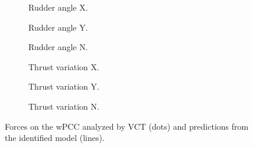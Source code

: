\begin{figure}[h]
    \vfill
     \begin{subfigure}[b]{0.32\textwidth}
         \centering
         
        \caption{Rudder angle X.}
        \label{fig:rudder_angle_X_wPCC}
     \end{subfigure}
     \hfill
     \begin{subfigure}[b]{0.32\textwidth}
         \centering
         
        \caption{Rudder angle Y.}
        \label{fig:rudder_angle_Y_wPCC}
     \end{subfigure}
     \hfill
     \begin{subfigure}[b]{0.32\textwidth}
         \centering
         
        \caption{Rudder angle N.}
        \label{fig:rudder_angle_N_wPCC}
     \end{subfigure}

     \vfill
     \begin{subfigure}[b]{0.32\textwidth}
         \centering
         
        \caption{Thrust variation X.}
        \label{fig:Thrust variation_X_wPCC}
     \end{subfigure}
     \hfill
     \begin{subfigure}[b]{0.32\textwidth}
         \centering
         
        \caption{Thrust variation Y.}
        \label{fig:Thrust variation_Y_wPCC}
     \end{subfigure}
     \hfill
     \begin{subfigure}[b]{0.32\textwidth}
         \centering
         
        \caption{Thrust variation N.}
        \label{fig:Thrust variation_N_wPCC}
     \end{subfigure}
     
    \caption{Forces on the wPCC analyzed by VCT (dots) and predictions from the identified model (lines).}
    \label{fig:VCT_wPCC}
\end{figure}

